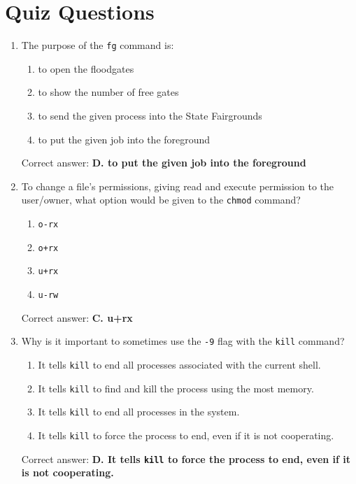 \documentclass{article}
\begin{document}
\section*{Quiz Questions}

\begin{enumerate}
  \item The purpose of the \texttt{fg} command is:
  \begin{enumerate}
    \item to open the floodgates
    \item to show the number of free gates
    \item to send the given process into the State Fairgrounds
    \item to put the given job into the foreground
  \end{enumerate}
  Correct answer: \textbf{D. to put the given job into the foreground}
  
  \item To change a file's permissions, giving read and execute permission to the user/owner, what option would be given to the \texttt{chmod} command?
  \begin{enumerate}
    \item \texttt{o-rx}
    \item \texttt{o+rx}
    \item \texttt{u+rx}
    \item \texttt{u-rw}
  \end{enumerate}
  Correct answer: \textbf{C. u+rx}
  
  \item Why is it important to sometimes use the \texttt{-9} flag with the \texttt{kill} command?
  \begin{enumerate}
    \item It tells \texttt{kill} to end all processes associated with the current shell.
    \item It tells \texttt{kill} to find and kill the process using the most memory.
    \item It tells \texttt{kill} to end all processes in the system.
    \item It tells \texttt{kill} to force the process to end, even if it is not cooperating.
  \end{enumerate}
  Correct answer: \textbf{D. It tells \texttt{kill} to force the process to end, even if it is not cooperating.}
  
  
\end{enumerate}
\end{document}
